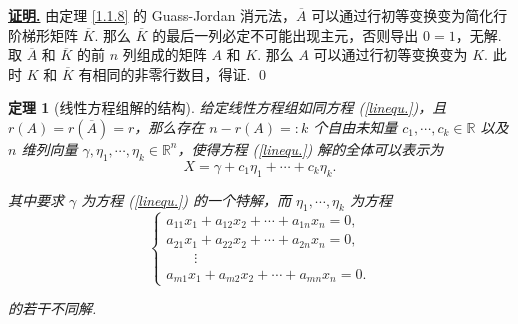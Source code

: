 \documentclass[10pt,openany]{article}
\theoremstyle{thmstyle} %
\newtheorem{theorem}{定理}[subsection]
\theoremstyle{defstyle} %
\theoremstyle{prostyle} %
\theoremstyle{exastyle}
\theoremstyle{remstyle}
\renewenvironment{proof}[1][证明]{\par\underline{\textbf{#1.}} \;\fangsong}{\qed\par}
\begin{document}
\begin{proof}
	由定理 \ref{1.1.8} 的 Guass-Jordan 消元法，\( \overline{A} \) 可以通过行初等变换变为简化行阶梯形矩阵 \( \overline{K} \). 那么 \( \overline{K} \) 的最后一列必定不可能出现主元，否则导出 \( 0=1 \)，无解. 取 \( \overline{A} \) 和 \( \overline{K} \) 的前 \( n \) 列组成的矩阵 \( A \) 和 \( K \). 那么 \( A \) 可以通过行初等变换变为 \( K \). 此时 \( K \) 和 \( \overline{K} \) 有相同的非零行数目，得证.
\end{proof}

\begin{theorem}[线性方程组解的结构]	\label{1.1.13}
	给定线性方程组如同方程 (\ref{linequ.})，且 \( r(A)=r(\overline{A})=r \)，那么存在 \( n-r(A)=:k \) 个自由未知量 \( c_1,\cdots,c_{k} \in \mathbb{R} \) 以及 \( n \) 维列向量 \( \gamma,\eta_1,\cdots,\eta_k \in \mathbb{R}^n \)，使得方程 (\ref{linequ.}) 解的全体可以表示为
	\[ X=\gamma+c_1\eta_1+\cdots+c_k\eta_k. \] 
    
    其中要求 \( \gamma \) 为方程 (\ref{linequ.}) 的一个特解，而 \( \eta_1,\cdots,\eta_k \) 为方程
    	\begin{equation}
    		\left\{\begin{array}{l}
    			a_{11}x_1+a_{12}x_2+\cdots+a_{1n}x_n=0, \\
    			a_{21}x_1+a_{22}x_2+\cdots+a_{2n}x_n=0, \\
    			\qquad \vdots \\
    			a_{m1}x_1+a_{m2}x_2+\cdots+a_{mn}x_n=0.
    		\end{array}\right.
    		\label{linequ.2}
    	\end{equation}
    	
    的若干不同解.
\end{theorem}
\end{document}
